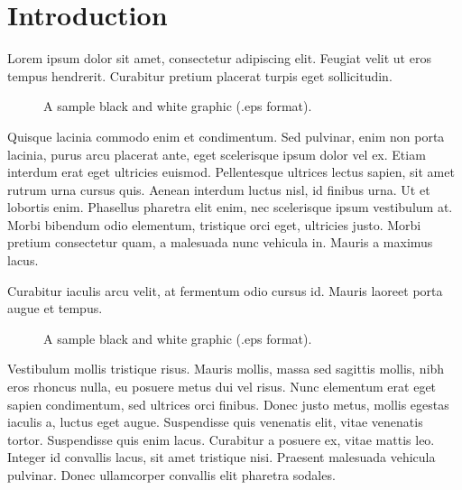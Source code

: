 \section{Introduction}
Lorem ipsum dolor sit amet, consectetur adipiscing elit. 
Feugiat velit ut eros tempus hendrerit.
Curabitur pretium placerat turpis eget sollicitudin.
\begin{figure}
\centering
{}
\caption{A sample black and white graphic (.eps format).}
\end{figure}
Quisque lacinia commodo enim et condimentum.
Sed pulvinar, enim non porta lacinia, purus arcu placerat ante, eget scelerisque ipsum dolor vel ex.
Etiam interdum erat eget ultricies euismod.
Pellentesque ultrices lectus sapien, sit amet rutrum urna cursus quis.
Aenean interdum luctus nisl, id finibus urna.
Ut et lobortis enim.
Phasellus pharetra elit enim, nec scelerisque ipsum vestibulum at.
Morbi bibendum odio elementum, tristique orci eget, ultricies justo.
Morbi pretium consectetur quam, a malesuada nunc vehicula in.
Mauris a maximus lacus.


Curabitur iaculis arcu velit, at fermentum odio cursus id.
Mauris laoreet porta augue et tempus.
\begin{figure*}
\centering
{}
\caption{A sample black and white graphic (.eps format).}
\end{figure*}

Vestibulum mollis tristique risus.
Mauris mollis, massa sed sagittis mollis, nibh eros rhoncus nulla, eu posuere metus dui vel risus.
Nunc elementum erat eget sapien condimentum, sed ultrices orci finibus.
Donec justo metus, mollis egestas iaculis a, luctus eget augue.
Suspendisse quis venenatis elit, vitae venenatis tortor.
Suspendisse quis enim lacus.
Curabitur a posuere ex, vitae mattis leo.
Integer id convallis lacus, sit amet tristique nisi.
Praesent malesuada vehicula pulvinar.
Donec ullamcorper convallis elit pharetra sodales.

